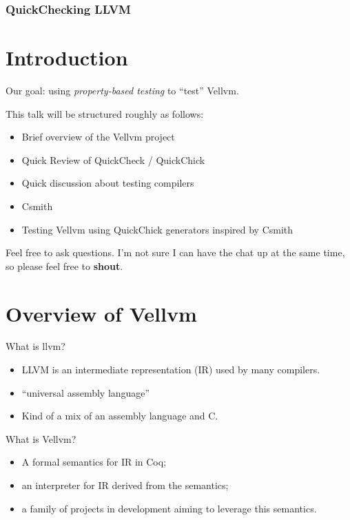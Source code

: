 \documentclass{beamer}
\author{
  Beck, Calvin\\
  \href{mailto:hobbes@seas.upenn.edu}{hobbes@seas.upenn.edu}
  \and\\~\\
  Zakowski, Yannick\\
  \href{mailto:zakowski@seas.upenn.edu}{zakowski@seas.upenn.edu}
}
\begin{document}
\begin{frame}
  \frametitle{QuickChecking LLVM}
  \maketitle
\end{frame}

\section{Introduction}

\begin{frame}

  Our goal: using \emph{property-based testing} to ``test'' Vellvm.

  This talk will be structured roughly as follows:
  
  \begin{itemize}
  \item Brief overview of the Vellvm project
  \item Quick Review of QuickCheck / QuickChick
  \item Quick discussion about testing compilers
  \item Csmith
  \item Testing Vellvm using QuickChick generators inspired by Csmith
  \end{itemize}

  Feel free to ask questions. I'm not sure I can have the chat up at
  the same time, so please feel free to {\bf shout}.
\end{frame}

\section{Overview of Vellvm}

\begin{frame}
  What is llvm?

   \begin{itemize}
    \item LLVM is an intermediate representation (IR) used by many
      compilers.
    \item ``universal assembly language''
    \item Kind of a mix of an assembly language and C.
   \end{itemize}

   What is Vellvm?
   \begin{itemize}
   \item A formal semantics for IR in Coq;
   \item an interpreter for IR derived from the semantics;
   \item a family of projects in development aiming to leverage this semantics.
   \end{itemize}

\end{frame}
\end{document}
